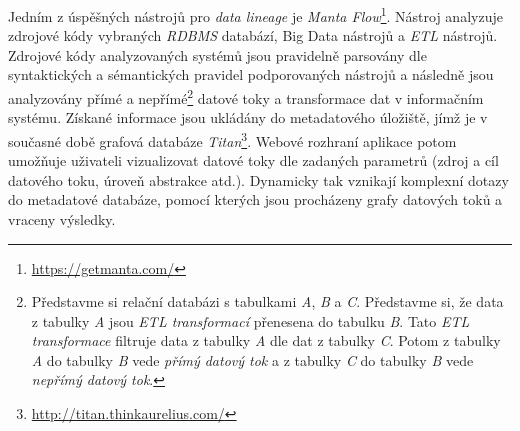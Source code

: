 Jedním z úspěšných nástrojů pro \textit{data lineage} je \textit{Manta Flow}\footnote{\url{https://getmanta.com/}}. Nástroj analyzuje zdrojové kódy vybraných \textit{RDBMS} databází, Big Data nástrojů a \textit{ETL} nástrojů.
Zdrojové kódy analyzovaných systémů jsou pravidelně parsovány dle syntaktických a sémantických pravidel podporovaných nástrojů a následně jsou analyzovány přímé a nepřímé\footnote{Představme si relační databázi s tabulkami \textit{A}, \textit{B} a \textit{C}. Představme si, že data z tabulky \textit{A} jsou \textit{ETL transformací} přenesena do tabulku \textit{B}. Tato \textit{ETL transformace} filtruje data z tabulky \textit{A} dle dat z tabulky \textit{C}. Potom z tabulky \textit{A} do tabulky \textit{B} vede \textit{přímý datový tok} a z tabulky \textit{C} do tabulky \textit{B} vede \textit{nepřímý datový tok}.} datové toky a transformace dat v informačním systému.
Získané informace jsou ukládány do metadatového úložiště, jímž je v současné době grafová databáze \textit{Titan}\footnote{\url{http://titan.thinkaurelius.com/}}. Webové rozhraní aplikace potom umožňuje uživateli vizualizovat datové toky dle zadaných parametrů (zdroj a cíl datového toku, úroveň abstrakce atd.). Dynamicky tak vznikají komplexní dotazy do metadatové databáze, pomocí kterých jsou procházeny grafy datových toků a vraceny výsledky.

